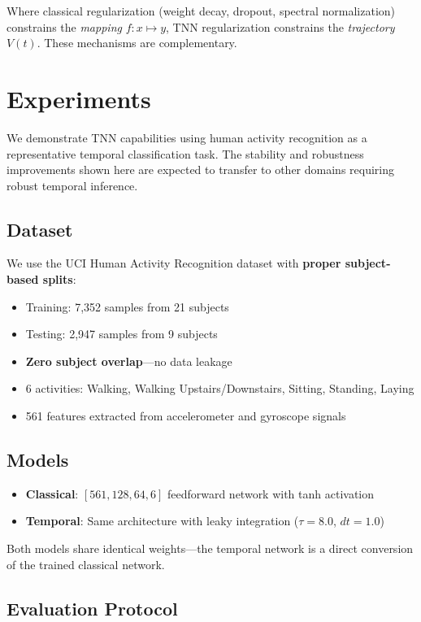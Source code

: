 \documentclass[11pt]{article}
\begin{document}
Where classical regularization (weight decay, dropout, spectral normalization) constrains the \emph{mapping} $f: x \mapsto y$, TNN regularization constrains the \emph{trajectory} $V(t)$. These mechanisms are complementary.

\section{Experiments}

We demonstrate TNN capabilities using human activity recognition as a representative temporal classification task. The stability and robustness improvements shown here are expected to transfer to other domains requiring robust temporal inference.

\subsection{Dataset}

We use the UCI Human Activity Recognition dataset with \textbf{proper subject-based splits}:
\begin{itemize}
    \item Training: 7,352 samples from 21 subjects
    \item Testing: 2,947 samples from 9 subjects
    \item \textbf{Zero subject overlap}---no data leakage
    \item 6 activities: Walking, Walking Upstairs/Downstairs, Sitting, Standing, Laying
    \item 561 features extracted from accelerometer and gyroscope signals
\end{itemize}

\subsection{Models}

\begin{itemize}
    \item \textbf{Classical}: $[561, 128, 64, 6]$ feedforward network with tanh activation
    \item \textbf{Temporal}: Same architecture with leaky integration ($\tau = 8.0$, $dt = 1.0$)
\end{itemize}

Both models share identical weights---the temporal network is a direct conversion of the trained classical network.

\subsection{Evaluation Protocol}
\end{document}
